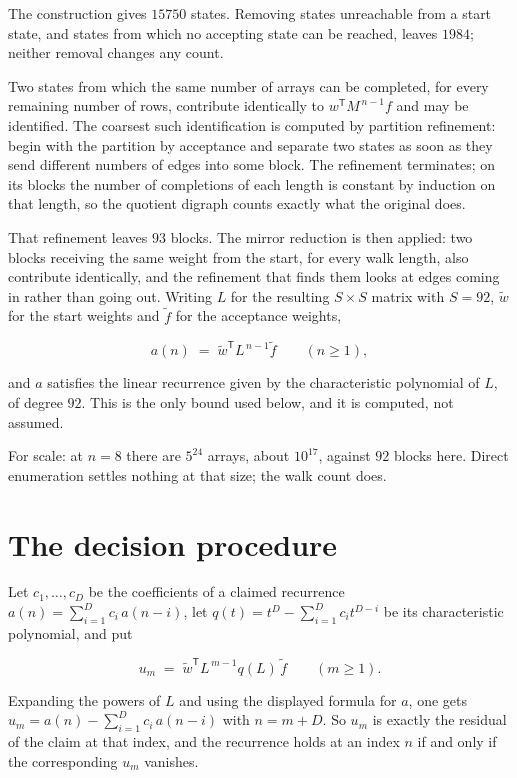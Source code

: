 \documentclass[11pt]{article}
\theoremstyle{definition}
\begin{document}
The construction gives $15750$ states. Removing states unreachable from a start state, and states from which no accepting state can be reached, leaves $1984$; neither removal changes any count.

Two states from which the same number of arrays can be completed, for every remaining number of rows, contribute identically to $w^{\mathsf T}M^{\,n-1}f$ and may be identified. The coarsest such identification is computed by partition refinement: begin with the partition by acceptance and separate two states as soon as they send different numbers of edges into some block. The refinement terminates; on its blocks the number of completions of each length is constant by induction on that length, so the quotient digraph counts exactly what the original does.

That refinement leaves $93$ blocks. The mirror reduction is then applied: two blocks receiving the same weight from the start, for every walk length, also contribute identically, and the refinement that finds them looks at edges coming in rather than going out. Writing $L$ for the resulting $S \times S$ matrix with $S = 92$, $\tilde w$ for the start weights and $\tilde f$ for the acceptance weights,

\[a(n) \;=\; \tilde w^{\mathsf T} L^{\,n-1} \tilde f \qquad (n \ge 1),\]

and $a$ satisfies the linear recurrence given by the characteristic polynomial of $L$, of degree $92$. This is the only bound used below, and it is computed, not assumed.

For scale: at $n = 8$ there are $5^{24}$ arrays, about $10^{17}$, against $92$ blocks here. Direct enumeration settles nothing at that size; the walk count does.

\section{The decision procedure}

Let $c_1,\dots,c_D$ be the coefficients of a claimed recurrence $a(n) = \sum_{i=1}^{D} c_i\,a(n-i)$, let $q(t) = t^{D} - \sum_{i=1}^{D} c_i t^{D-i}$ be its characteristic polynomial, and put

\[u_m \;=\; \tilde w^{\mathsf T} L^{\,m-1} q(L)\,\tilde f \qquad (m \ge 1).\]

Expanding the powers of $L$ and using the displayed formula for $a$, one gets $u_m = a(n) - \sum_{i=1}^{D} c_i\,a(n-i)$ with $n = m + D$. So $u_m$ is exactly the residual of the claim at that index, and the recurrence holds at an index $n$ if and only if the corresponding $u_m$ vanishes.
\end{document}
